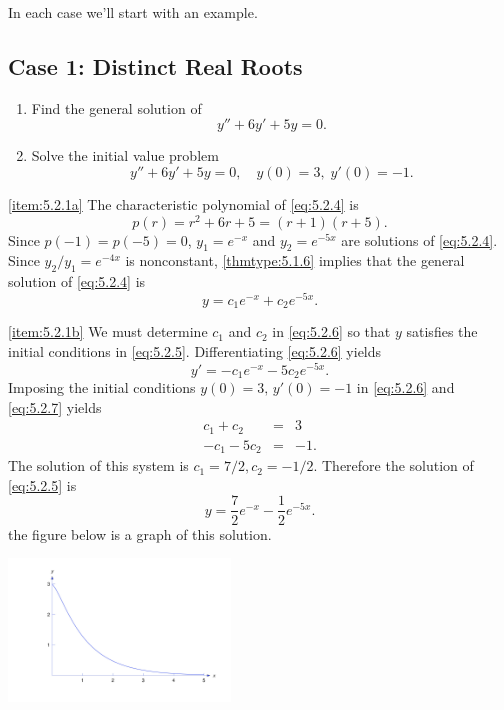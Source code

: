 \documentclass{ximera}
\begin{document}
In each case we'll start with an example.
 
\subsection*{Case 1: Distinct Real Roots}
 
\begin{example}\label{example:5.2.1}
\begin{enumerate}
    \item \label{item:5.2.1a}%
Find the general solution of
\begin{equation} \label{eq:5.2.4}
y''+6y'+5y=0.
\end{equation}
 
\item \label{item:5.2.1b}%
Solve the initial value problem
\begin{equation} \label{eq:5.2.5}
y''+6y'+5y=0, \quad   y(0)=3,\;  y'(0)=-1.
\end{equation}
\end{enumerate}
 
\begin{explanation}
\ref{item:5.2.1a}   The characteristic
polynomial of
 \eqref{eq:5.2.4} is
$$
p(r)=r^2+6r+5=(r+1)(r+5).
$$
Since $p(-1)=p(-5)=0$,  $y_1=e^{-x}$ and $y_2=e^{-5x}$
are solutions of \eqref{eq:5.2.4}. Since $y_2/y_1=e^{-4x}$  is
nonconstant, \ref{thmtype:5.1.6} implies that the general solution
of \eqref{eq:5.2.4} is
\begin{equation} \label{eq:5.2.6}
y=c_1e^{-x}+c_2e^{-5x}.
\end{equation}
 
\ref{item:5.2.1b} We  must determine $c_1$ and $c_2$
in  \eqref{eq:5.2.6} so that $y$ satisfies the initial conditions in
 \eqref{eq:5.2.5}. Differentiating  \eqref{eq:5.2.6} yields
\begin{equation} \label{eq:5.2.7}
y'=-c_1e^{-x}-5c_2e^{-5x}.
\end{equation}
Imposing the initial conditions $y(0)=3,\, y'(0)=-1$ in \eqref{eq:5.2.6}
and \eqref{eq:5.2.7} yields
$$\begin{array}{rcr}
c_1+c_2 & = & 3\\
-c_1-5c_2 & = & -1.
\end{array}$$
 The solution of this system is $c_1=7/2,c_2=-1/2$.  Therefore
the solution of  \eqref{eq:5.2.5} is
$$
y=\frac{7}{2}e^{-x}-\frac{1}{2}e^{-5x}.
$$
 the figure below is a graph
of this solution.
 
\begin{image}
 \includegraphics[height=1.5in]{fig050201.jpg}
\end{image}
 
\end{explanation}
\end{example}
 
\end{document}
